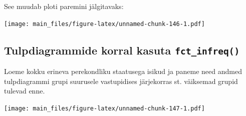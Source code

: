 \documentclass[]{book}
\newenvironment{Shaded}{\begin{snugshade}}{\end{snugshade}}
\newcommand{\KeywordTok}[1]{\textcolor[rgb]{0.13,0.29,0.53}{\textbf{#1}}}
\newcommand{\DataTypeTok}[1]{\textcolor[rgb]{0.13,0.29,0.53}{#1}}
\newcommand{\StringTok}[1]{\textcolor[rgb]{0.31,0.60,0.02}{#1}}
\newcommand{\OperatorTok}[1]{\textcolor[rgb]{0.81,0.36,0.00}{\textbf{#1}}}
\newcommand{\NormalTok}[1]{#1}
\begin{document}
See muudab ploti paremini jälgitavaks:

\begin{Shaded}
\end{Shaded}

\texttt{[image: main\_files/figure-latex/unnamed-chunk-146-1.pdf]}

\subsection{\texorpdfstring{Tulpdiagrammide korral kasuta
\texttt{fct\_infreq()}}{Tulpdiagrammide korral kasuta fct\_infreq()}}\label{tulpdiagrammide-korral-kasuta-fct_infreq}

Loeme kokku erineva perekondliku staatusega isikud ja paneme need andmed
tulpdiagrammi grupi suurusele vastupidises järjekorras st. väiksemad
grupid tulevad enne.

\begin{Shaded}
\end{Shaded}

\texttt{[image: main\_files/figure-latex/unnamed-chunk-147-1.pdf]}


\end{document}
